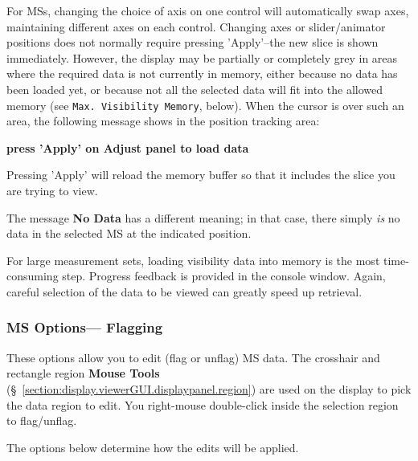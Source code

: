 For MSs, changing the choice of axis on one control will automatically
swap axes, maintaining different axes on each control.  Changing axes
or slider/animator positions does not normally require pressing
'Apply'--the new slice is shown immediately.  However, the display may be 
partially or completely grey in areas where the required data is not
currently in memory, either because no data has been loaded yet, or
because not all the selected data will fit into the allowed memory
(see {\tt Max. Visibility Memory}, below).  When the
cursor is over such an area, the following message shows in the position
tracking area:

{\bf press 'Apply' on Adjust panel to load data}

Pressing 'Apply' will reload the memory buffer so that it includes
the slice you are trying to view.

The message {\bf No Data} has a different meaning; in that
case, there simply {\it is} no data in the selected MS at the
indicated position.

For large measurement sets, loading visibility data into memory is the
most time-consuming step.  Progress feedback is provided in the
console window.  Again, careful selection of the data to be viewed can
greatly speed up retrieval.


\subsubsection{MS Options--- Flagging}
\label{section:display.ms.adjust.flagging}

These options allow you to edit (flag or unflag) MS data.
The crosshair and rectangle region {\bf Mouse Tools}
(\S~\ref{section:display.viewerGUI.displaypanel.region}) are used on
the display to pick the data region to edit.  You right-mouse 
double-click inside the selection region to flag/unflag.

The options below determine how the edits will be applied.

